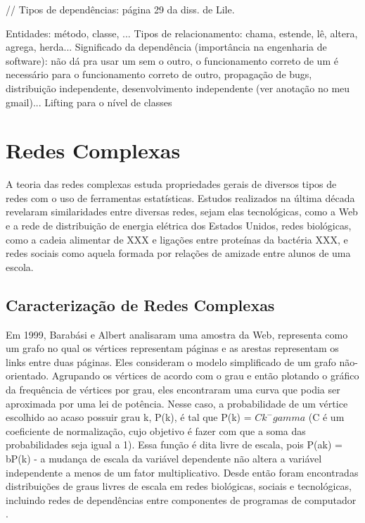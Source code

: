 \documentclass{article}
\begin{document}
// Tipos de dependências: página 29 da diss. de Lile.

Entidades: método, classe, ...
Tipos de relacionamento: chama, estende, lê, altera, agrega, herda...
Significado da dependência (importância na engenharia de software): não dá pra usar um sem o outro, o funcionamento correto de um é necessário para o funcionamento correto de outro, propagação de bugs, distribuição independente, desenvolvimento independente (ver anotação no meu gmail)...
Lifting para o nível de classes

\section{Redes Complexas}

A teoria das redes complexas estuda propriedades gerais de diversos tipos de redes com o uso de ferramentas estatísticas. Estudos realizados na última década revelaram similaridades entre diversas redes, sejam elas tecnológicas, como a Web e a rede de distribuição de energia elétrica dos Estados Unidos, redes biológicas, como a cadeia alimentar de XXX e ligações entre proteínas da bactéria XXX, e redes sociais como aquela formada por relações de amizade entre alunos de uma escola.

\subsection{Caracterização de Redes Complexas}

Em 1999, Barabási e Albert \cite{Barabasi1999} analisaram uma amostra da Web, representa como um grafo no qual os vértices representam páginas e as arestas representam os links entre duas páginas. Eles consideram o modelo simplificado de um grafo não-orientado. Agrupando os vértices de acordo com o grau e então plotando o gráfico da frequência de vértices por grau, eles encontraram uma curva que podia ser aproximada por uma lei de potência. Nesse caso, a probabilidade de um vértice escolhido ao acaso possuir grau k, P(k), é tal que P(k) = $Ck^-gamma$ (C é um coeficiente de normalização, cujo objetivo é fazer com que a soma das probabilidades seja igual a 1). Essa função é dita livre de escala, pois P(ak) = bP(k) - a mudança de escala da variável dependente não altera a variável independente a menos de um fator multiplicativo. Desde então foram encontradas distribuições de graus livres de escala em redes biológicas, sociais e tecnológicas, incluindo redes de dependências entre componentes de programas de computador \cite{Valverde2003}.
\end{document}
